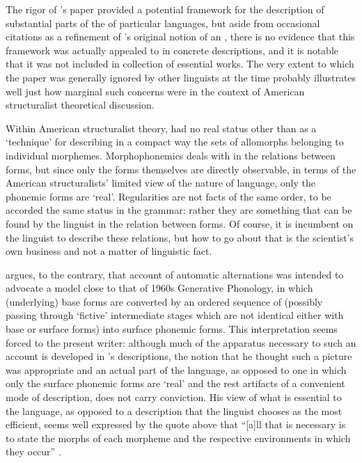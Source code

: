 The rigor of {\Wells}'s paper provided a potential framework for the
description of substantial parts of the  of particular
languages, but aside from occasional citations as a refinement of
{\Bloomfield}'s original notion of an , there is no
evidence that this framework was actually appealed to in concrete
descriptions, and it is notable that it was not included in
 collection of essential works. The very
extent to which the paper was generally ignored by other linguists at
the time probably illustrates well just how marginal such concerns
were in the context of American structuralist theoretical discussion.

Within American structuralist theory,  had no real
status other than as a `technique' for describing in a compact way the
sets of allomorphs belonging to individual morphemes. Morphophonemics
deals with  in the relations between forms, but since only
the forms themselves are directly observable, in terms of the American
structuralists' limited view of the nature of language, only the
phonemic forms are `real'. Regularities are not facts of the same
order, to be accorded the same status in the grammar: rather they are
something that can be found by the linguist in the relation between
forms. Of course, it is incumbent on the linguist to describe these
relations, but how to go about that is the scientist's own business
and not a matter of linguistic fact.

\citet{goldsmith08:genphon.in.40s} argues, to the contrary, that
 account of automatic alternations was
intended to advocate a model close to that of 1960s Generative
Phonology, in which (underlying) base forms are converted by an
ordered sequence of  (possibly passing through
`fictive' intermediate stages which are not identical either with base
or surface forms) into surface phonemic forms. This interpretation
seems forced to the present writer: although much of the apparatus
necessary to such an account is developed in {\Wells}'s descriptions, the
notion that he thought such a picture was appropriate and an actual
part of the language, as opposed to one in which only the surface
phonemic forms are `real' and the rest artifacts of a convenient mode
of description, does not carry conviction.  His view of what is
essential to the language, as opposed to a description that the
linguist chooses as the most efficient, seems well expressed by the
quote above that ``[a]ll that is necessary is to state the morphs of
each morpheme and the respective environments in which they occur''
\citep[102]{wells49:automatic}.

